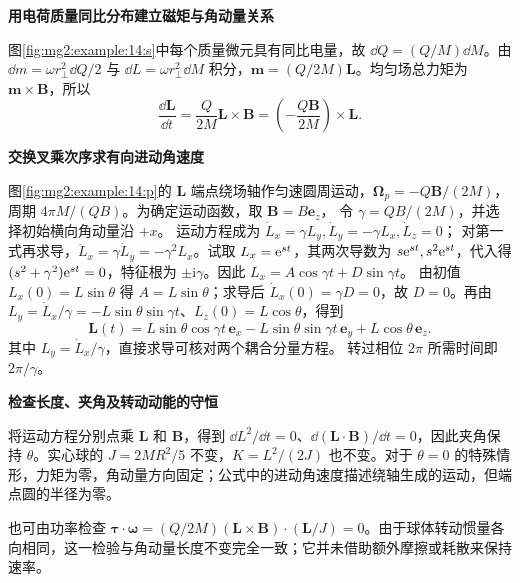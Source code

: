 \begin{solution}\textbf{用电荷质量同比分布建立磁矩与角动量关系}\par\nobreak
图\ref{fig:mg2:example:14:s}中每个质量微元具有同比电量，故 $\dd Q=(Q/M)\dd M$。由 $\dd m=\omega r_\perp^2\dd Q/2$ 与 $\dd L=\omega r_\perp^2\dd M$ 积分，$\bm m=(Q/2M)\bm L$。均匀场总力矩为 $\bm m\times\bm B$，所以
\[
\frac{\dd\bm L}{\dd t}=\frac{Q}{2M}\bm L\times\bm B
=\left(-\frac{Q\bm B}{2M}\right)\times\bm L.
\]



\par\medskip{}\noindent\textbf{交换叉乘次序求有向进动角速度}\par\nobreak
图\ref{fig:mg2:example:14:p}的 $\bm L$ 端点绕场轴作匀速圆周运动，$\bm\Omega_p=-Q\bm B/(2M)$，周期 $4\pi M/(QB)$。为确定运动函数，取 $\bm B=B\bm e_z$，
令 $\gamma=QB/(2M)$，并选择初始横向角动量沿 $+x$。
运动方程成为 $\dot L_x=\gamma L_y,\dot L_y=-\gamma L_x,\dot L_z=0$；
对第一式再求导，$\ddot L_x=\gamma\dot L_y=-\gamma^2L_x$。试取 $L_x=\mathrm e^{st}$，其两次导数为 $s\mathrm e^{st},s^2\mathrm e^{st}$，代入得 $(s^2+\gamma^2)\mathrm e^{st}=0$，特征根为 $\pm\mathrm i\gamma$。因此 $L_x=A\cos\gamma t+D\sin\gamma t$。
由初值 $L_x(0)=L\sin\theta$ 得 $A=L\sin\theta$；求导后 $\dot L_x(0)=\gamma D=0$，故 $D=0$。再由 $L_y=\dot L_x/\gamma=-L\sin\theta\sin\gamma t$、$L_z(0)=L\cos\theta$，得到
\[
 \bm L(t)=L\sin\theta\cos\gamma t\,\bm e_x
 -L\sin\theta\sin\gamma t\,\bm e_y+L\cos\theta\,\bm e_z.
\]
其中 $L_y=\dot L_x/\gamma$，直接求导可核对两个耦合分量方程。
转过相位 $2\pi$ 所需时间即 $2\pi/\gamma$。

\par\medskip{}\noindent\textbf{检查长度、夹角及转动动能的守恒}\par\nobreak
将运动方程分别点乘 $\bm L$ 和 $\bm B$，得到 $\dd L^2/\dd t=0$、$\dd(\bm L\cdot\bm B)/\dd t=0$，因此夹角保持 $\theta$。实心球的 $J=2MR^2/5$ 不变，$K=L^2/(2J)$ 也不变。对于 $\theta=0$ 的特殊情形，力矩为零，角动量方向固定；公式中的进动角速度描述绕轴生成的运动，但端点圆的半径为零。

也可由功率检查 $\bm\tau\cdot\bm\omega=(Q/2M)(\bm L\times\bm B)\cdot(\bm L/J)=0$。由于球体转动惯量各向相同，这一检验与角动量长度不变完全一致；它并未借助额外摩擦或耗散来保持速率。\end{solution}
